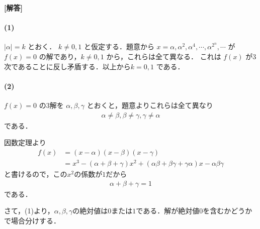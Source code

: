 \documentclass[../../main.tex]{subfiles}
\begin{document}
\begin{oframed}
  
\end{oframed}

{\bf [解答]}

\paragraph{(1)}

$|\alpha|=k$ とおく．
$k\ne0,1$ と仮定する．題意から $x=\alpha,\alpha^2,\alpha^4,\cdots,\alpha^{2^n},\cdots$ が $f(x)=0$ の解であり，$k\ne0,1$ から，これらは全て異なる．
これは $f(x)$ が3次であることに反し矛盾する．以上から$k=0,1$ である．

\paragraph{(2)}

$f(x)=0$ の3解を $\alpha,\beta,\gamma$ とおくと，題意よりこれらは全て異なり
\begin{align}
  \alpha\ne\beta,\beta\ne\gamma,\gamma\ne\alpha \label{eq:1}
\end{align}
である．

因数定理より
\begin{align}
  f(x)
  &= (x-\alpha)(x-\beta)(x-\gamma) \\
  &= x^3 - (\alpha+\beta+\gamma)x^2 + (\alpha\beta+\beta\gamma+\gamma\alpha)x - \alpha\beta\gamma \label{eq:2}
\end{align}
と書けるので，この$x^2$の係数が$1$だから
\begin{align}
  \alpha+\beta+\gamma = 1 \label{eq:3}
\end{align}
である．

さて，(1)より，$\alpha,\beta,\gamma$の絶対値は$0$または$1$である．解が絶対値$0$を含むかどうかで場合分けする．
\end{document}

